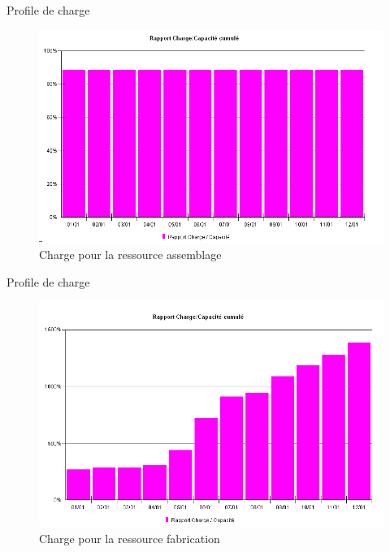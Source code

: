 
\begin{frame}{Profile de charge}
\begin{figure}[H]
\centering
\includegraphics[scale=0.4]{captures/charge_assemblage.PNG}
\caption{Charge pour la ressource assemblage}
\end{figure}
\end{frame}

\begin{frame}{Profile de charge}
\begin{figure}[H]
\centering
\includegraphics[scale=0.4]{captures/charge_fab.PNG}
\caption{Charge pour la ressource fabrication}
\end{figure}
\end{frame}


